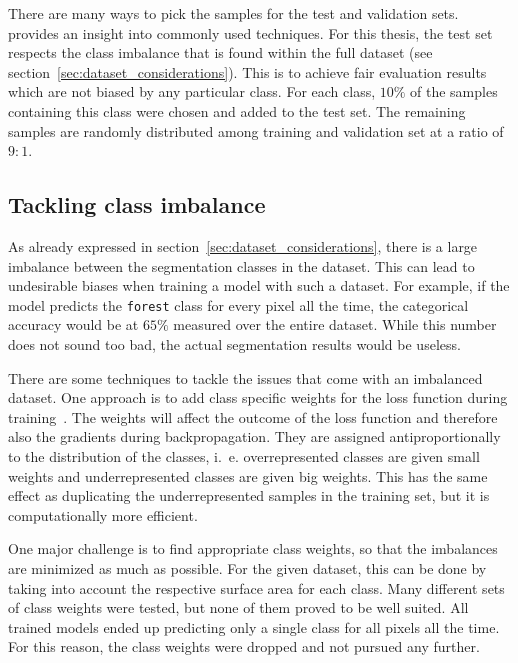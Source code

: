There are many ways to pick the samples for the test and validation sets. \cite{val_split18} provides an insight into commonly used techniques. For this thesis, the test set respects the class imbalance that is found within the full dataset (see section~\ref{sec:dataset_considerations}). This is to achieve fair evaluation results which are not biased by any particular class. For each class, $10\%$ of the samples containing this class were chosen and added to the test set. The remaining samples are randomly distributed among training and validation set at a ratio of $9:1$.

\subsection{Tackling class imbalance}
\label{sec:class_imbalance}

As already expressed in section~\ref{sec:dataset_considerations}, there is a large imbalance between the segmentation classes in the dataset. This can lead to undesirable biases when training a model with such a dataset. For example, if the model predicts the \texttt{forest} class for every pixel all the time, the categorical accuracy would be at $65\%$ measured over the entire dataset. While this number does not sound too bad, the actual segmentation results would be useless.

There are some techniques to tackle the issues that come with an imbalanced dataset. One approach is to add class specific weights for the loss function during training~\cite{class_imbalance19}. The weights will affect the outcome of the loss function and therefore also the gradients during backpropagation. They are assigned antiproportionally to the distribution of the classes, i.~e. overrepresented classes are given small weights and underrepresented classes are given big weights. This has the same effect as duplicating the underrepresented samples in the training set, but it is computationally more efficient.

One major challenge is to find appropriate class weights, so that the imbalances are minimized as much as possible. For the given dataset, this can be done by taking into account the respective surface area for each class. Many different sets of class weights were tested, but none of them proved to be well suited. All trained models ended up predicting only a single class for all pixels all the time. For this reason, the class weights were dropped and not pursued any further.

